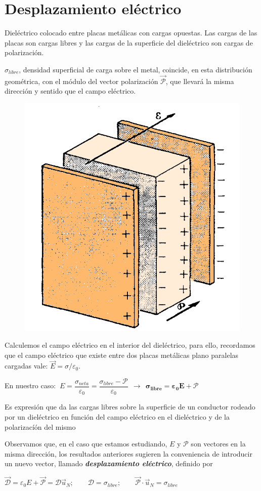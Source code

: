 \section{Desplazamiento eléctrico}

\begin{multicols}{2}
	Dieléctrico colocado entre placas metálicas con cargas opuestas. Las cargas de las placas son cargas libres y las cargas de la superficie del dieléctrico son cargas de polarización.

$\sigma_{libre}$, densidad superficial de carga sobre el metal, coincide, en esta distribución geométrica, con el módulo del vector polarización $\vec {\mathcal P}$, que llevará la misma dirección y sentido que el campo eléctrico.
\begin{figure}[H]
	\centering
	\includegraphics[width=.35\textwidth]{imagenes/imagenes24/T24IM10.png}
\end{figure}
\end{multicols}

Calculemos el campo eléctrico en el interior del dieléctrico, para ello, recordamos que el campo eléctrico que existe entre dos placas metálicas plano paralelas cargadas vale: $\vec E=\sigma / \varepsilon_0$.

En nuestro caso: $\ E=\dfrac{\sigma_{neta}}{\varepsilon_0}=\dfrac{\sigma_{libre}- \mathcal P}{\varepsilon_0} \ \ \to \ \  \boldsymbol{ \sigma_{libre}=\varepsilon_0 E + \mathcal P }$

Es expresión que da las cargas libres sobre la superficie de un conductor rodeado por un dieléctrico en función del campo eléctrico en el dieléctrico y de la polarizacíón del mismo

Observamos que, en el caso que estamos estudiando, $E$ y $\mathcal P$ son vectores en la misma dirección, los resultados anteriores sugieren la conveniencia de introducir un nuevo vector, llamado \emph{\textbf{desplazamiento eléctrico}}, definido por

$\vec{\mathcal D}=\varepsilon_0 E + \vec{\mathcal P}=\mathcal D \vec u_N;\qquad \mathcal D=\sigma_{libre};\qquad \vec {\mathcal P} \cdot \vec u_N=\sigma_{libre}$


